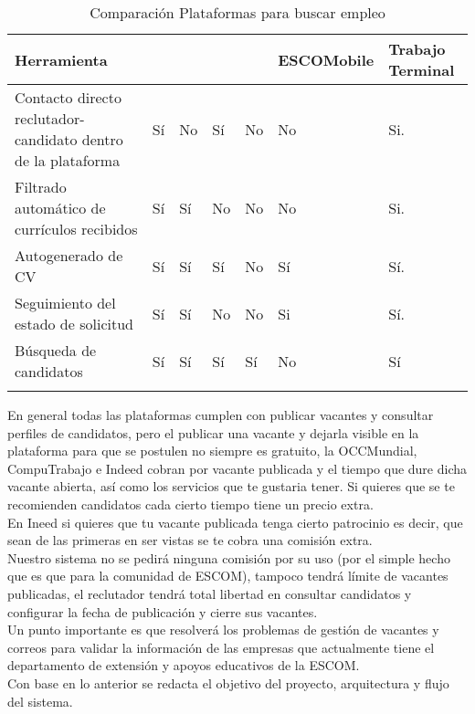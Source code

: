 \begin{longtable}{| p{}  | p{} | p{}  | p{}  | p{}  | p{}  |  p{}  |}

    \hline

    \textbf{Herramienta} & \IUocc{}	& \IUcompuT{}&  \IUIneed{} & \IUsisae{} & \scriptsize \textbf{ESCOMobile} & \scriptsize Trabajo Terminal\\ 
    \hline

    Contacto directo reclutador-candidato dentro de la plataforma & Sí & No  & Sí  & No  & No & Si.\\ \hline
    Filtrado automático de currículos recibidos & Sí & Sí & No & No & No & Si.\\ \hline
    Autogenerado de CV & Sí & Sí & Sí  & No & Sí & Sí. \\ \hline
    Seguimiento del estado de solicitud & Sí  & Sí & No & No  & Si& Sí. \\ \hline
    Búsqueda de candidatos & Sí & Sí & Sí & Sí & No & Sí\\ \hline

    \caption{Comparación Plataformas para buscar empleo}
    \label{table:herramientasSimilares}
\end{longtable}

En general todas las plataformas cumplen con publicar vacantes y consultar perfiles de candidatos, pero el publicar una vacante y dejarla visible en la plataforma para que se postulen no siempre es gratuito, la OCCMundial, CompuTrabajo e Indeed cobran por vacante publicada y el tiempo que dure dicha vacante abierta, así como los servicios que te gustaria tener. Si quieres que se te recomienden candidatos cada cierto tiempo tiene un precio extra.\\

En Ineed si quieres que tu vacante publicada tenga cierto patrocinio es decir, que sean de las primeras en ser vistas se te cobra una comisión extra.\\
\newline
Nuestro sistema no se pedirá ninguna comisión por su uso (por el simple hecho que es que para la comunidad de ESCOM), tampoco tendrá límite de vacantes publicadas, el reclutador tendrá total libertad en consultar candidatos y configurar la fecha de publicación y cierre sus vacantes. \\

Un punto importante es que resolverá los problemas de gestión de vacantes  y correos para validar la información de las empresas que actualmente tiene el departamento de extensión y apoyos educativos de la ESCOM.\\
\newline
Con base en lo anterior se redacta el objetivo del proyecto, arquitectura y flujo del sistema.

